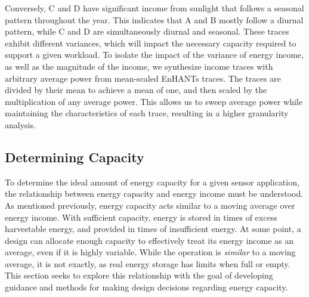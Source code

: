 Conversely, C and D have significant income from sunlight that follows a seasonal pattern throughout the year.
This indicates that A and B mostly follow a diurnal pattern, while C and D are simultaneously diurnal and seasonal.
These traces exhibit different variances, which will impact the necessary capacity required to support a given workload.
To isolate the impact of the variance of energy income, as well as the magnitude of the income, we synthesize income traces with arbitrary average power from mean-scaled EnHANTs traces. The traces are divided by their mean to achieve a mean of one, and then scaled by the multiplication of any average power.
This allows us to sweep average power while maintaining the characteristics of each trace, resulting in a higher granularity analysis.


\subsection{Determining Capacity}
\label{sec:capacity:determining_cap}
To determine the ideal amount of energy capacity for a given sensor application, the relationship between energy capacity and energy income must be understood.
As mentioned previously, energy capacity acts similar to a moving average over energy income. With sufficient capacity, energy is stored in times of excess harvestable energy, and provided in times of insufficient energy.
At some point, a design can allocate enough capacity to effectively treat its energy income as an average, even if it is highly variable.
While the operation is \textit{similar} to a moving average, it is not exactly, as real energy storage has limits when full or empty.
This section seeks to explore this relationship with the goal of developing guidance and methods for making design decisions regarding energy capacity. 

